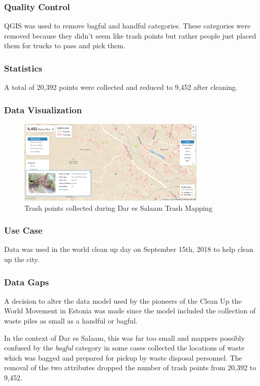 \documentclass[a4paper,12pt,twoside]{article}
\begin{document}
\subsubsection{Quality Control}
QGIS was used to remove bagful and handful categories.
These categories were removed because they didn't seem like trash points but rather people just placed them for trucks to pass and pick them.


\subsubsection{Statistics}
A total of 20,392 points were collected and reduced to 9,452 after cleaning.

\subsubsection{Data Visualization}
\begin{figure}[h]
  \color{RHgreen}\caption{Trash points collected during Dar es Salaam Trash Mapping}
  \centering
 \includegraphics[width=0.8\textwidth]{images/dar_trash.png}
\end{figure}

\subsubsection{Use Case}
Data was used in the world clean up day on  September 15th, 2018 to help clean up the city.

\subsubsection{Data Gaps}
A decision to alter the data model used by the pioneers of the Clean Up the World Movement in Estonia was made since the model included the collection of waste piles as small as a handful or bagful.

In the context of Dar es Salaam, this was far too small and mappers possibly confused by the \textit{bagful} category in some cases collected the locations of waste which was bagged and prepared for pickup by waste disposal personnel. The removal of the two attributes dropped the number of trash points from 20,392 to 9,452.
\end{document}
